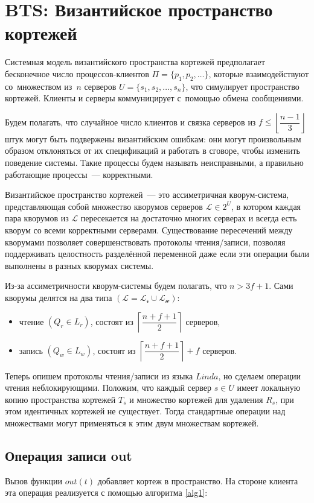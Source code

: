 \section{BTS: Византийское пространство кортежей}\label{sec:5}
Системная модель византийского пространства кортежей предполагает бесконечное число процессов-клиентов $\Pi = \{p_1, p_2, \dots\}$, которые взаимодействуют со~множеством из~$n$ серверов $U = \{s_1, s_2, \dots, s_n\}$, что симулирует пространство кортежей. Клиенты и серверы коммуницирует с~помощью обмена сообщениями.

Будем полагать, что случайное число клиентов и связка серверов из $f \leqslant \left\lfloor \dfrac{n-1}{3} \right\rfloor$ штук могут быть подвержены византийским ошибкам: они могут произвольным образом отклоняться от их спецификаций и работать в сговоре, чтобы изменить поведение системы. Такие процессы будем называть неисправными, а правильно работающие процессы~--- корректными.

Византийское пространство кортежей~--- это ассиметричная кворум-система, представляющая собой множество кворумов серверов $\mathcal{L} \in 2^{U}$, в котором каждая пара кворумов из $\mathcal{L}$ пересекается на достаточно многих серверах и всегда есть кворум со всеми корректными серверами. Существование пересечений между кворумами позволяет совершенствовать протоколы чтения/записи, позволяя поддерживать целостность разделённой переменной даже если эти операции были выполнены в разных кворумах системы.

Из-за ассиметричности кворум-системы будем полагать, что  $n > 3f + 1$. Сами кворумы делятся на два типа $(\mathcal{L} = \mathcal{L_r} \cup \mathcal{L_w})$:
\begin{itemize}
	\item чтение $(Q_r \in L_r)$, состоят из $\left\lceil \dfrac{n+f+1}{2} \right\rceil$ серверов,
	\item запись $(Q_w \in L_w)$, состоят из $\left\lceil \dfrac{n+f+1}{2} \right\rceil + f$ серверов.
\end{itemize}

Теперь опишем протоколы чтения/записи из языка $Linda$, но сделаем операции чтения неблокирующими. Положим, что каждый сервер $s \in U$ имеет локальную копию пространства кортежей $T_s$ и множество кортежей для удаления $R_s$, при этом идентичных кортежей не существует. Тогда стандартные операции над множествами могут применяться к этим двум множествам кортежей.

\subsection{Операция записи out}\label{subsec5:1}
Вызов функции $out(t)$ добавляет кортеж в пространство. На стороне клиента эта операция реализуется с помощью алгоритма \ref{alg1}:

